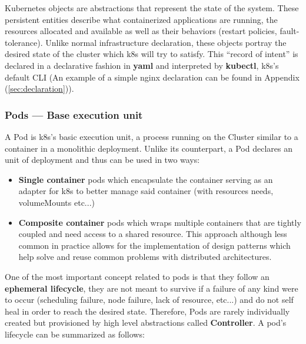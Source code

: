 \documentclass[11pt]{article}
\begin{document}
\hspace{5mm} Kubernetes objects are abstractions that represent the state of the system. These persistent entities describe what containerized applications are running, the resources allocated and available as well as their behaviors (restart policies, fault-tolerance). Unlike normal infrastructure declaration, these objects portray the desired state of the cluster which k8s will try to satisfy. This “record of intent” is declared in a declarative fashion in \textbf{yaml} and interpreted by \textbf{kubectl}, k8s's default CLI (An example of a simple nginx declaration can be found in Appendix (\ref{sec:declaration})).


\subsubsection{Pods — Base execution unit}

\hspace{5mm} A Pod is k8s's basic execution unit, a process running on the Cluster similar to a container in a monolithic deployment. Unlike its counterpart, a Pod declares an unit of deployment and thus can be used in two ways:
\begin{itemize}
    \item \textbf{Single container} pods which encapsulate the container serving as an adapter for k8s to better manage said container (with resources needs, volumeMounts etc...)
    \item \textbf{Composite container} pods which wraps multiple containers that are tightly coupled and need access to a shared resource. This approach although less common in practice allows for the implementation of design patterns which help solve and reuse common problems with distributed architectures.
\end{itemize}

One of the most important concept related to pods is that they follow an \textbf{ephemeral lifecycle}, they are not meant to survive if a failure of any kind were to occur (scheduling failure, node failure, lack of resource, etc...) and do not self heal in order to reach the desired state. Therefore, Pods are rarely individually created but provisioned by high level abstractions called \textbf{Controller}. A pod's lifecycle can be summarized as follows:
\end{document}
